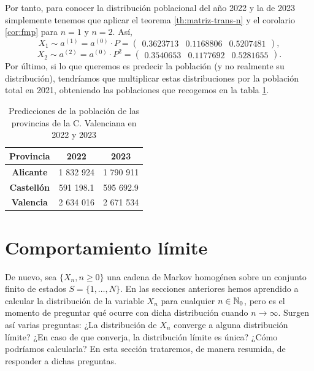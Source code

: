 \begin{ejemplo}
        
        Por tanto, para conocer la distribución poblacional del año 2022 y la de 2023 simplemente tenemos que aplicar el teorema \ref{th:matriz-trans-n} y el corolario \ref{cor:fmp} para $n=1$ y $n=2$. Así,
        \begin{equation*}
            X_1\sim a^{(1)} = a^{(0)}\cdot P = \begin{pmatrix}
                0.3623713 &
                0.1168806 &
                0.5207481
            \end{pmatrix},
        \end{equation*}
        \begin{equation*}
            X_2 \sim a^{(2)} = a^{(0)}\cdot P^2 = \begin{pmatrix}
                0.3540653 &
                0.1177692 &
                0.5281655
            \end{pmatrix}.
        \end{equation*}
        Por último, si lo que queremos es predecir la población (y no realmente su distribución), tendríamos que multiplicar estas distribuciones por la población total en 2021, obteniendo las poblaciones que recogemos en la tabla \ref{tab:predicciones}.

        \begin{table}[h]
            \centering
            \begin{tabular}{ccc}\hline
            \textbf{Provincia}          & \textbf{2022} & \textbf{2023} \\ \hline\hline
            \textbf{Alicante}   & 1 832 924   & 1 790 911     \\ \hline
            \textbf{Castellón} & 591 198.1     & 595 692.9    \\ \hline
            \textbf{Valencia}  & 2 634 016   & 2 671 534    \\ \hline
            \end{tabular}
            \caption{Predicciones de la población de las provincias de la C. Valenciana en 2022 y 2023}
            \label{tab:predicciones}
            \end{table}

\end{ejemplo}

\section{Comportamiento límite}

De nuevo, sea $\{X_n, n\geq 0\}$ una cadena de Markov homogénea sobre un conjunto finito de estados $S=\{1,\dots,N\}$. En las secciones anteriores hemos aprendido a calcular la distribución de la variable $X_n$ para cualquier $n\in\mathbb{N}_0$, pero es el momento de preguntar qué ocurre con dicha distribución cuando $n\rightarrow\infty$. Surgen así varias preguntas: ¿La distribución de $X_n$ converge a alguna distribución límite? ¿En caso de que converja, la distribución límite es única? ¿Cómo podríamos calcularla? En esta sección trataremos, de manera resumida, de responder a dichas preguntas.

